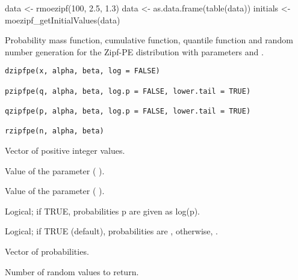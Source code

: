 \documentclass[letterpaper]{book}
\begin{document}
%
\begin{Examples}
\begin{ExampleCode}
data <- rmoezipf(100, 2.5, 1.3)
data <- as.data.frame(table(data))
initials <- moezipf_getInitialValues(data)
\end{ExampleCode}
\end{Examples}
%
\begin{Description}\relax
Probability mass function, cumulative function, quantile function and random number generation
for the Zipf-PE distribution with parameters \eqn{\alpha}{} and \eqn{\beta}{}.
\end{Description}
%
\begin{Usage}
\begin{verbatim}
dzipfpe(x, alpha, beta, log = FALSE)

pzipfpe(q, alpha, beta, log.p = FALSE, lower.tail = TRUE)

qzipfpe(p, alpha, beta, log.p = FALSE, lower.tail = TRUE)

rzipfpe(n, alpha, beta)
\end{verbatim}
\end{Usage}
%
\begin{Arguments}
\begin{ldescription}
\item[\code{x, q}] Vector of positive integer values.

\item[\code{alpha}] Value of the \eqn{\alpha}{} parameter ( ).

\item[\code{beta}] Value of the \eqn{\beta}{} parameter ( ).

\item[\code{log, log.p}] Logical; if TRUE, probabilities p are given as log(p).

\item[\code{lower.tail}] Logical; if TRUE (default), probabilities are , otherwise, .

\item[\code{p}] Vector of probabilities.

\item[\code{n}] Number of random values to return.
\end{ldescription}
\end{Arguments}
\end{document}
